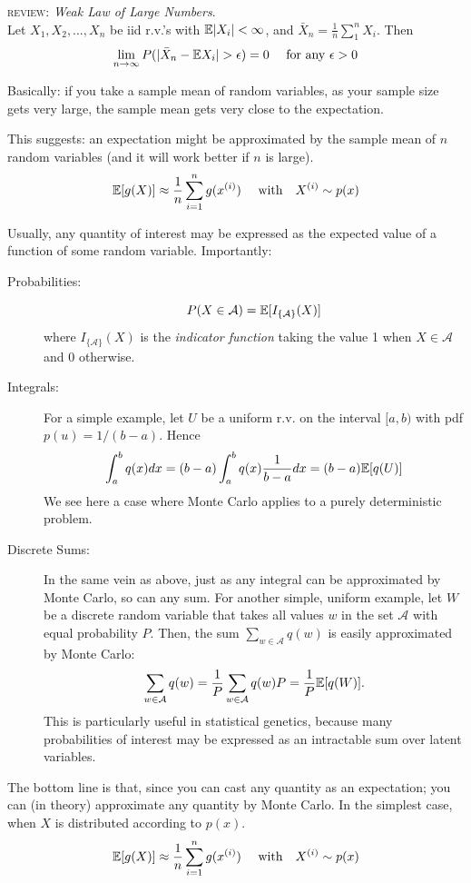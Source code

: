 \textsc{review:} {\sl Weak Law of Large Numbers}.\\
Let $X_1,X_2,\ldots,X_n$ be iid  r.v.'s with $\Bbb{E}|X_i|<\infty$, and $\bar{X}_n = \frac{1}{n}\sum_{1}^nX_i$.  Then 
\[
\lim_{n\rightarrow\infty} P(|\bar{X}_n - \Bbb{E} X_i| > \epsilon) = 0~~~~\mathrm{for~any}~\epsilon>0 
\]

Basically: if you take a sample mean of random variables, as your sample size gets very large, the sample mean gets very close to the expectation. 

This suggests: an expectation might be approximated by the sample mean of $n$ random variables (and it will work better if $n$ is large).
\[
	\Bbb{E}[g(X)] \approx \frac{1}{n}\sum_{i=1}^n g(x^{(i)})~~~~\mathrm{with}~~~X^{(i)}\sim p(x)
\]



Usually, any quantity of interest may be expressed as the expected value of a function of some random variable.  Importantly:
\begin{description}
\item[Probabilities:] 
\[
	P(X\in \mathcal{A}) = \Bbb{E}[ I_{\{\mathcal{A}\}}(X)]
\]
where $I_{\{\mathcal{A}\}}(X)$ is the {\em indicator function} taking the value 1 when $X\in\mathcal{A}$ and 0 otherwise.
\item[Integrals:] For a simple example, let $U$ be a uniform r.v. on the interval $[a,b)$ with pdf $p(u) = 1/(b-a)$.  Hence 
\[
	\int_a^b q(x)dx = (b-a)\int_a^b q(x)\frac{1}{b-a}dx = (b-a)\Bbb{E}[q(U)]
\]
We see here a case where Monte Carlo applies to a purely deterministic problem.
\item[Discrete Sums:] In the same vein as above, just as any integral can be approximated by Monte Carlo, so can any sum. For another simple, uniform example, let $W$ be a discrete random variable that takes all values $w$ in the set $\mathcal{A}$ with equal probability $P$. Then, the sum $\sum_{w\in\mathcal{A}}q(w)$ is easily approximated by Monte Carlo:
\[
	\sum_{w\in\mathcal{A}}q(w)  = {\displaystyle\frac{1}{P}  }
	\sum_{w\in\mathcal{A}}q(w)P = 
	{\displaystyle\frac{1}{P}  }
	\Bbb{E}[q(W)].
\]   
This is particularly useful in statistical genetics, because many probabilities of interest may be expressed as an intractable sum over latent variables.
\end{description}

The bottom line is that, since you can cast any quantity as an expectation; you can (in theory) approximate any quantity by Monte Carlo.  In the simplest case, when $X$ is distributed according to $p(x)$.  
\[
	\Bbb{E}[g(X)] \approx \frac{1}{n}\sum_{i=1}^n g(x^{(i)})~~~~\mathrm{with}~~~X^{(i)}\sim p(x)
\]

